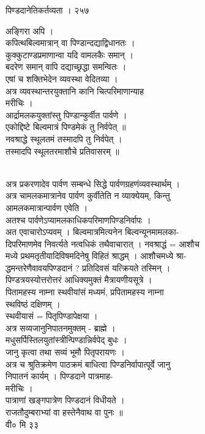 \documentclass[11pt, openany]{book}
\begin{document}
{{{{{{{{{{{{{{{{{{  पिण्डदानेतिकर्तव्यता । २५७

{अङ्गिरा अपि ।\\
कपित्थबिल्वमात्रान् वा पिण्डान्दद्याद्विधानतः ।\\
कुक्कुटाण्डप्रमाणान्वा यदि वामलकैः समान् ।\\
बदरेण समान् वापि दद्याच्छ्रद्धा समन्वितः ।\\
एषां च शक्तिभेदेन व्यवस्था वेदितव्या ।\\
अत्र व्यवस्थान्तरयुक्तानि कानि चित्परिमाणान्याह\\
मरीचिः ।\\
आर्द्रामलकयुक्तांस्तु पिण्डान्कुर्वीत पार्वणे ।\\
एकोद्दिष्टे बिल्वमात्रं पिण्डमेकं तु निर्वपेत् ॥\\
नवश्राद्धे स्थूलतमं तस्मादपि तु निर्वपेत् ।\\
तस्मादपि स्थूलतरमाशौचे प्रतिवासरम् }{॥}{\\
अत्र प्रकरणादेव पार्वण सम्बन्धे सिद्धे पार्वणग्रहणंव्यवस्थार्थम् ।\\
अत्र चामलकमात्रानेव पार्वण कुर्वीतेति न व्याक्येयम्, किन्तु\\
आमलकमात्रान्पार्वण एवेति ।\\
अतश्च पार्वणेऽप्यामलकाधिकपरिमाणपिण्डनिर्वापः ।\\
अत एवाचारोऽप्यवम् । बिल्वमात्रमित्यनेन बिल्वन्यूनमामलका-\\
दिपरिमाणमेव निवर्त्यते नत्वधिकं तथैवाचारात् । नवश्राद्धं = आशौच\\
मध्ये प्रथमतृतीयादिविषमदिनेषु विहितं श्राद्धम् । आशौचमध्ये श्रा-\\
द्धमन्तरेणैवावयपिण्डदानं ? प्रतिदिवसं यत्क्रियते तस्मिन् ।\\
पिण्डत्रयस्योत्तरोत्तरं आधिक्यमुक्तं मैत्रायणीयसूत्रे ।\\
पितामहस्य नाम्ना स्थवीयांसं मध्यमं, प्रपितामहस्य नाम्ना\\
स्थविष्ठं दक्षिणम् ।\\
स्थवीयासं = पितृपिण्डापेक्षया ।\\
अत्र सव्यजानुनिपातनमुक्तम् - ब्राह्मे ।\\
मधुसर्पिस्तिलयुतांस्त्रीन्पिण्डान्निर्वपेद् बुधः ।\\
जानु कृत्वा तथा सव्यं भूमौ पितृपरायणः ।\\
अत्र च श्रुतिक्रमेण पाठक्रमं बाधित्वा पिण्डनिर्वापात्पूर्वे जानु\\
निपातनं कार्यम् । पिण्डदाने पात्रमाह-\\
मरीचिः ।\\
पात्राणां खङ्गपात्रेण पिण्डदानं विधीयते ।\\
राजतौदुम्बराभ्यां वा हस्तेनैवाथ वा पुनः ॥\\
वी० मि ३३

}}}}}}}}}}}}}}}}}}}
\end{document}
